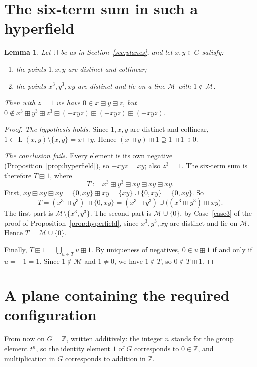 \documentclass[11pt]{article}
\newtheorem{lemma}[theorem]{Lemma}
\theoremstyle{definition}
\theoremstyle{remark}
\newcommand{\HH}{\mathbb{H}}
\newcommand{\Z}{\mathbb{Z}}
\newcommand{\bp}{\boxplus}
\DeclareMathOperator{\Ln}{L}
\begin{document}
\section{The six-term sum in such a hyperfield}

\begin{lemma}\label{lem:sixterm}
Let $\HH$ be as in Section~\ref{sec:planes}, and let $x,y\in G$ satisfy:
\begin{enumerate}[label=\textup{(\roman*)},nosep]
\item the points $1,x,y$ are distinct and collinear;
\item the points $x^3,y^3,xy$ are distinct and lie on a line $\mathcal M$ with $1\notin\mathcal M$.
\end{enumerate}
Then with $z=1$ we have $0\in x\bp y\bp z$, but $0\notin x^3\bp y^3\bp z^3\bp(-xyz)\bp(-xyz)\bp(-xyz)$.
\end{lemma}

\begin{proof}
\emph{The hypothesis holds.} Since $1,x,y$ are distinct and collinear, $1\in\Ln(x,y)\setminus\{x,y\}=x\bp y$. Hence $(x\bp y)\bp 1\supseteq 1\bp 1\ni 0$.

\emph{The conclusion fails.} Every element is its own negative (Proposition~\ref{prop:hyperfield}), so $-xyz=xy$; also $z^3=1$. The six-term sum is therefore $T\bp 1$, where
\[
T:=x^3\bp y^3\bp xy\bp xy\bp xy .
\]
First, $xy\bp xy\bp xy=\{0,xy\}\bp xy=\{xy\}\cup\{0,xy\}=\{0,xy\}$. So
\[
T=(x^3\bp y^3)\bp\{0,xy\}=(x^3\bp y^3)\cup\bigl((x^3\bp y^3)\bp xy\bigr).
\]
The first part is $\mathcal M\setminus\{x^3,y^3\}$. The second part is $\mathcal M\cup\{0\}$, by Case~\ref{case3} of the proof of Proposition~\ref{prop:hyperfield}, since $x^3,y^3,xy$ are distinct and lie on $\mathcal M$. Hence $T=\mathcal M\cup\{0\}$.

Finally, $T\bp 1=\bigcup_{u\in T}u\bp 1$. By uniqueness of negatives, $0\in u\bp 1$ if and only if $u=-1=1$. Since $1\notin\mathcal M$ and $1\neq0$, we have $1\notin T$, so $0\notin T\bp 1$.
\end{proof}

\section{A plane containing the required configuration}

From now on $G=\Z$, written additively: the integer $n$ stands for the group element $t^n$, so the identity element $1$ of $G$ corresponds to $0\in\Z$, and multiplication in $G$ corresponds to addition in $\Z$.
\end{document}
